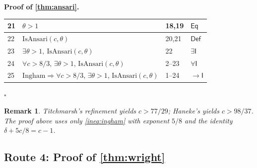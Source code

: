 \documentclass[11pt,reqno]{amsart}
\theoremstyle{blueplain}
\newtheorem{remark}{Remark}[section]
\renewcommand{\qedsymbol}{\textcolor{proofqed}{\ensuremath{\square}}}
\renewenvironment{proof}[1][Proof]{\par\noindent\textbf{\textcolor{proofhead}{#1.}}\par\nobreak}{\par\nobreak\hfill\qedsymbol}
\numberwithin{equation}{section}
\begin{document}
\begin{proof}[\textbf{Proof of \cref{thm:ansari}}]
{\begin{tabular}{|m{0.7cm}|m{12cm}|m{1.4cm}|m{2.5cm}|}
			21 & $\theta>1$ & 18,19 & $\mathsf{Eq}$ \\ \hline
			22 & $\mathrm{IsAnsari}(c,\theta)$ & 20,21 & $\mathsf{Def}$ \\ \hline
			23 & $\exists\theta>1,\ \mathrm{IsAnsari}(c,\theta)$ & 22 & $\exists\mathsf{I}$ \\ \hline
			24 & $\forall c>8/3$, $\exists\theta>1$, $\mathrm{IsAnsari}(c,\theta)$ & 2--23 & $\forall\mathsf{I}$ \\ \hline
			25 & $\text{Ingham}\Rightarrow\forall c>8/3$, $\exists\theta>1$, $\mathrm{IsAnsari}(c,\theta)$ & 1--24 & $\rightarrow\mathsf{I}$ \\ \hline
		\end{tabular}
	}
\end{proof}

\begin{remark}
	{\scriptsize Titchmarsh's refinement yields $c>77/29$; Haneke's yields $c>98/37$.  The proof above uses only \cref{ineq:ingham} with exponent $5/8$ and the identity $\delta+5c/8=c-1$. }
\end{remark}

\subsection{Route 4: Proof of \cref{thm:wright}}
\end{document}
